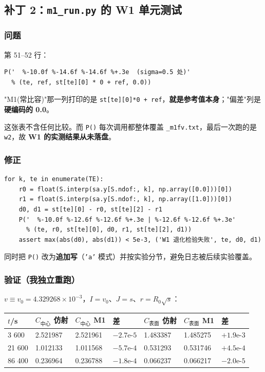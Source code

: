 \subsection{补丁 2：\texttt{m1\_run.py} 的 W1 单元测试}


\subsubsection{问题}


第 51–52 行：


\begin{lstlisting}
P('  %-10.0f %-14.6f %-14.6f %+.3e  (sigma=0.5 处)'
  % (te, ref, st[te][0] * 0 + ref, 0.0))
\end{lstlisting}


"M1(常比容)"那一列打印的是 \texttt{st[te][0]*0 + ref}，\textbf{就是参考值本身}；"偏差"列是\textbf{硬编码的 0.0}。

这张表不含任何比较。而 \texttt{P()} 每次调用都整体覆盖 \texttt{\_m1fv.txt}，最后一次跑的是 \texttt{w2}，故 \textbf{W1 的实测结果从未落盘}。


\subsubsection{修正}


\begin{lstlisting}
for k, te in enumerate(TE):
    r0 = float(S.interp(sa.y[S.ndof:, k], np.array([0.0]))[0])
    r1 = float(S.interp(sa.y[S.ndof:, k], np.array([1.0]))[0])
    d0, d1 = st[te][0] - r0, st[te][2] - r1
    P('  %-10.0f %-12.6f %-12.6f %+.3e | %-12.6f %-12.6f %+.3e'
      % (te, r0, st[te][0], d0, r1, st[te][2], d1))
    assert max(abs(d0), abs(d1)) < 5e-3, ('W1 退化检验失败', te, d0, d1)
\end{lstlisting}


同时把 \texttt{P()} 改为\textbf{追加写}（\texttt{'a'} 模式）并按实验分节，避免日志被后续实验覆盖。


\subsubsection{验证（我独立重跑）}


$v\equiv v_0=4.329268\times10^{-3}$，$I=v_0$、$J=s$、$r=R_0\sqrt s$：


\begin{center}
\small
\begin{tabular}{lllllll}
\toprule
$t$/s & $C_{中心}$ 仿射 & $C_{中心}$ M1 & 差 & $C_{表面}$ 仿射 & $C_{表面}$ M1 & 差 \\
\midrule
3 600 & 2.521987 & 2.521961 & $-2.7\text{e-}5$ & 1.483387 & 1.485275 & $+1.9\text{e-}3$ \\
21 600 & 1.012133 & 1.011568 & $-5.7\text{e-}4$ & 0.531293 & 0.531746 & $+4.5\text{e-}4$ \\
86 400 & 0.236964 & 0.236788 & $-1.8\text{e-}4$ & 0.066237 & 0.066217 & $-2.0\text{e-}5$ \\
\bottomrule
\end{tabular}
\end{center}


